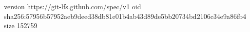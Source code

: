 version https://git-lfs.github.com/spec/v1
oid sha256:57956b57952aeb9deed38db81e01b4ab43d89de5bb20734bd2106c34e9a86fb4
size 152759
